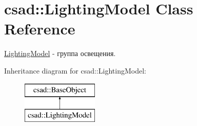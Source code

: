 \hypertarget{classcsad_1_1_lighting_model}{\section{csad\-:\-:Lighting\-Model Class Reference}
\label{classcsad_1_1_lighting_model}
}


\hyperlink{classcsad_1_1_lighting_model}{Lighting\-Model} -\/ группа освещения.  


Inheritance diagram for csad\-:\-:Lighting\-Model\-:\begin{figure}[H]
\begin{center}
\leavevmode
\includegraphics[height=2.000000cm]{classcsad_1_1_lighting_model}
\end{center}
\end{figure}
